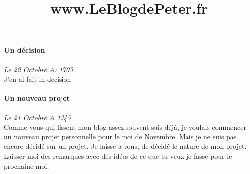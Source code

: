 \documentclass{article}
\begin{document}
\title{www.LeBlogdePeter.fr}

\paragraph{Un décision} \emph{Le 22 Octobre A: 1703}\\
J'en ai fait in decision 
\paragraph{Un nouveau projet} \emph{Le 21 Octobre A 1345} \\
Comme vous qui lissent mon blog assez souvent sais déjà, je voulais commencer un nouveau projet personnelle pour le moi de Novembre. Mais je ne suis pas encore décidé sur un projet. Je laisse a vous, de décidé le nature de mon projet. Laisser moi des remarques avec des idées de ce que tu veux je fasse pour le prochaine moi.
\end{document}
